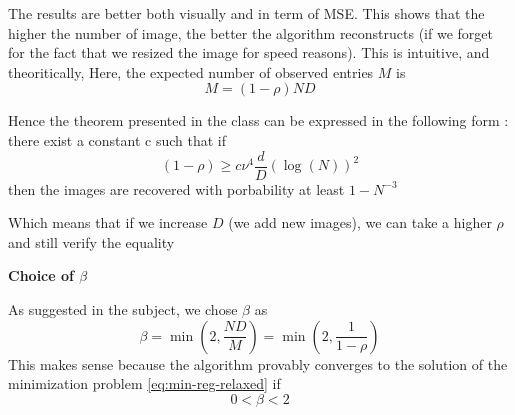 \documentclass[a4paper, 11pt]{article}
\newcommand{\ipart}[1]{\vspace{0.5em}\textbf{#1}\vspace{0.5em}}
\begin{document}

The results are better both visually and in term of MSE. This shows
that the higher the number of image, the better the algorithm
reconstructs (if we forget for the fact that we resized the image for
speed reasons). This is intuitive, and theoritically, Here, the
expected number of observed entries $M$ is
\begin{equation*}
  M = (1 - \rho) N D
\end{equation*}

Hence the theorem presented in the class can be expressed in the
following form : there exist a constant c such that if
\begin{equation*}
  (1 - \rho) \ge c \nu^4 \dfrac{d}{D} \left( \log(N) \right)^2
\end{equation*}
then the images are recovered with porbability at least $1 - N^{-3}$

Which means that if we increase $D$ (we add new images), we can take a
higher $\rho$ and still verify the equality

\ipart{Choice of $\beta$}

As suggested in the subject, we chose $\beta$ as
\begin{equation*}
  \beta = \min{\left( 2, \dfrac{N D}{M} \right)} = \min{\left( 2, \dfrac{1}{1 - \rho} \right)}
\end{equation*}
This makes sense because the algorithm provably converges
\hspace{.3em}\cite{svt} to the solution of the minimization problem
\eqref{eq:min-reg-relaxed} if
\begin{equation*}
  0 < \beta < 2
\end{equation*}



\end{document}
